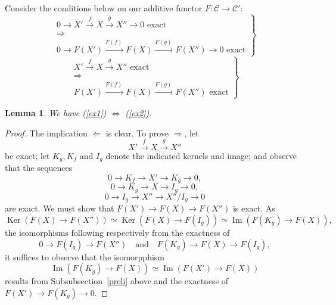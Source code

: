 \documentclass[12pt]{article}
\newtheorem{lem}[thm]{Lemma}
\theoremstyle{remark}
\theoremstyle{definition}
\newcommand{\C}{\mathcal C}
\newcommand{\then}{\Rightarrow}
\newcommand{\si}{\Leftarrow}
\newcommand{\ssi}{\Leftrightarrow}%
\DeclareMathOperator{\Ima}{Im}
\DeclareMathOperator{\Ker}{Ker}
\begin{document}
Consider the conditions below on our additive functor $F:\C\to\C'$:
%
\begin{equation}\label{ex1}
\left.
\begin{matrix}
0\to X'\overset{f}{\to}X\overset{g}{\to}X''\to0\text{ exact }\\ 
\then\\ 
0\to F(X')\overset{F(f)\ }{\longrightarrow}F(X)\overset{F(g)\ }{\longrightarrow}F(X'')\to0\text{ exact}
\end{matrix}
\right\}
\end{equation}
%
\begin{equation}\label{ex2}
\left.
\begin{matrix}
X'\overset{f}{\to}X\overset{g}{\to}X''\text{ exact }\\ 
\then\\ 
F(X')\overset{F(f)\ }{\longrightarrow}F(X)\overset{F(g)\ }{\longrightarrow}F(X'')\text{ exact}
\end{matrix}
\right\}
\end{equation}
%
\begin{lem}\label{817b}
We have (\ref{ex1}) $\ssi$ (\ref{ex2}).
\end{lem}
%
\begin{proof}
The implication $\si$ is clear. To prove $\then$, let 
$$
X'\overset{f}{\to}X\overset{g}{\to}X''
$$
be exact; let $K_g,K_f$ and $I_g$ denote the indicated kernels and image; and observe that the sequences 
$$
0\to K_f\to X'\to K_g\to 0,
$$
$$
0\to K_g\to X\to I_g\to 0,
$$
$$
0\to I_g\to X''\to X''/I_g\to 0
$$
are exact. We must show that $F(X')\to F(X)\to F(X'')$ is exact. As
$$
\Ker(F(X)\to F(X''))\simeq\Ker(F(X)\to F(I_g))\simeq\Ima(F(K_g)\to F(X)),$$ 
the isomorphisms following respectively from the exactness of 
$$
0\to F(I_g)\to F(X'')\quad\text{and}\quad F(K_g)\to F(X)\to F(I_g),
$$ 
it suffices to observe that the isomorpphism
%
\begin{equation}\label{kg}
\Ima(F(K_g)\to F(X))\simeq\Ima(F(X')\to F(X))
\end{equation}
%
results from Subsubsection~\ref{preli} above and the exactness of $F(X')\to F(K_g)\to0$.
\end{proof}
%
%
\end{document}
